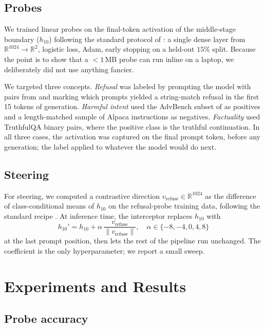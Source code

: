 \documentclass[11pt]{article}
\begin{document}
\subsection{Probes}

We trained linear probes on the final-token activation of the middle-stage boundary ($h_{10}$) following the standard protocol of \citet{alain2017probing}: a single dense layer from $\mathbb{R}^{1024} \to \mathbb{R}^2$, logistic loss, Adam, early stopping on a held-out $15\%$ split. Because the point is to show that a $<1\,\text{MB}$ probe can run inline on a laptop, we deliberately did not use anything fancier.

We targeted three concepts. \textit{Refusal} was labeled by prompting the model with pairs from \citet{arditi2024refusal} and marking which prompts yielded a string-match refusal in the first 15 tokens of generation. \textit{Harmful intent} used the AdvBench subset of \citet{zou2023universal} as positives and a length-matched sample of Alpaca instructions as negatives. \textit{Factuality} used TruthfulQA binary pairs, where the positive class is the truthful continuation. In all three cases, the activation was captured on the final prompt token, before any generation; the label applied to whatever the model would do next.

\subsection{Steering}

For steering, we computed a contrastive direction $v_\text{refuse} \in \mathbb{R}^{1024}$ as the difference of class-conditional means of $h_{10}$ on the refusal-probe training data, following the standard recipe \citep{turner2023activation, rimsky2023steering}. At inference time, the interceptor replaces $h_{10}$ with
\begin{equation*}
    h_{10}' = h_{10} + \alpha\, \frac{v_\text{refuse}}{\lVert v_\text{refuse}\rVert},\quad \alpha \in \{-8, -4, 0, 4, 8\}
\end{equation*}
at the last prompt position, then lets the rest of the pipeline run unchanged. The coefficient is the only hyperparameter; we report a small sweep.

\section{Experiments and Results}

\subsection{Probe accuracy}
\end{document}
